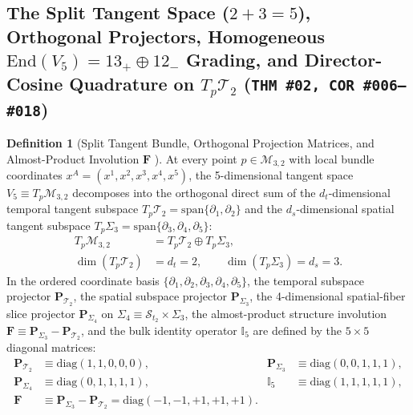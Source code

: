 \documentclass[11pt,a4paper]{article}
\newcommand{\catD}{\text{\textbf{\textcolor{blue!75!black}{[D]}}}}
\theoremstyle{definition}
\newtheorem{definition}[axiom]{Definition}
\theoremstyle{plain}
\theoremstyle{remark}
\begin{document}
\subsection{\texorpdfstring{The Split Tangent Space ($2 + 3 = 5$), Orthogonal Projectors, Homogeneous $\mathrm{End}(V_5) = 13_+ \oplus 12_-$ Grading, and Director-Cosine Quadrature on $T_p\mathcal{T}_2$ (\texttt{THM~\#02, COR~\#006--\#018})}{The Split Tangent Space (2 + 3 = 5), Orthogonal Projectors, Homogeneous End(V\_5) Grading, and Director-Cosine Quadrature on T\_p T\_2}}

\begin{definition}[Split Tangent Bundle, Orthogonal Projection Matrices, and Almost-Product Involution $\mathbf{F}$ \catD]\label{def:c1_tangent_split}
At every point $p \in \mathcal{M}_{3,2}$ with local bundle coordinates $x^A = (x^1, x^2, x^3, x^4, x^5)$, the 5-dimensional tangent space $V_5 \equiv T_p\mathcal{M}_{3,2}$ decomposes into the orthogonal direct sum of the $d_t$-dimensional temporal tangent subspace $T_p\mathcal{T}_2 = \mathrm{span}\{\partial_1, \partial_2\}$ and the $d_s$-dimensional spatial tangent subspace $T_p\Sigma_3 = \mathrm{span}\{\partial_3, \partial_4, \partial_5\}$:
\begin{align}
T_p\mathcal{M}_{3,2} &= T_p\mathcal{T}_2 \oplus T_p\Sigma_3, \nonumber \\[3pt]
\dim\!\left(T_p\mathcal{T}_2\right) &= d_t = 2, \qquad
\dim\!\left(T_p\Sigma_3\right) = d_s = 3. \label{eq:c1_tangent_direct_sum}
\end{align}
In the ordered coordinate basis $\{\partial_1, \partial_2, \partial_3, \partial_4, \partial_5\}$, the temporal subspace projector $\mathbf{P}_{\mathcal{T}_2}$, the spatial subspace projector $\mathbf{P}_{\Sigma_3}$, the 4-dimensional spatial-fiber slice projector $\mathbf{P}_{\Sigma_4}$ on $\Sigma_4 \equiv \mathcal{S}_{t_2} \times \Sigma_3$, the almost-product structure involution $\mathbf{F} \equiv \mathbf{P}_{\Sigma_3} - \mathbf{P}_{\mathcal{T}_2}$, and the bulk identity operator $\mathbb{I}_5$ are defined by the $5\times 5$ diagonal matrices:
\begin{align}
\mathbf{P}_{\mathcal{T}_2} &\equiv \mathrm{diag}(1, 1, 0, 0, 0), &
\mathbf{P}_{\Sigma_3} &\equiv \mathrm{diag}(0, 0, 1, 1, 1), \nonumber \\[3pt]
\mathbf{P}_{\Sigma_4} &\equiv \mathrm{diag}(0, 1, 1, 1, 1), &
\mathbb{I}_5 &\equiv \mathrm{diag}(1, 1, 1, 1, 1), \nonumber \\[3pt]
\mathbf{F} &\equiv \mathbf{P}_{\Sigma_3} - \mathbf{P}_{\mathcal{T}_2} = \mathrm{diag}(-1, -1, +1, +1, +1). & & \label{eq:c1_projectors_def}
\end{align}
\end{definition}
\end{document}
